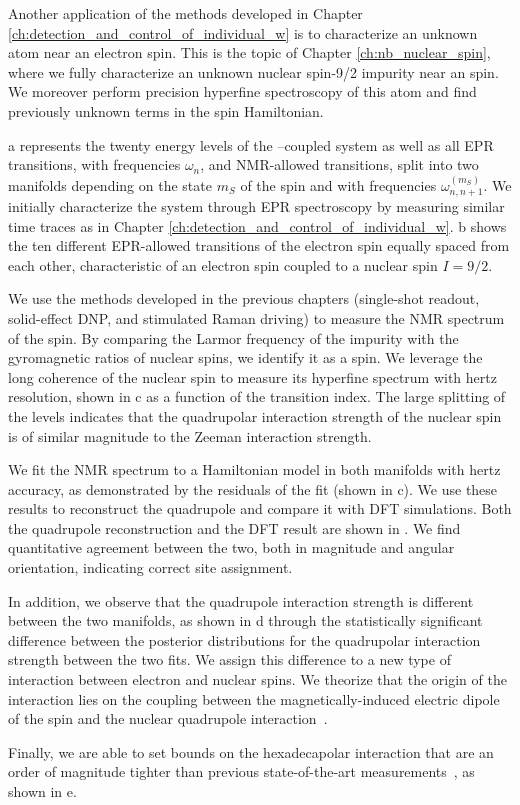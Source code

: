 Another application of the methods developed in Chapter \ref{ch:detection_and_control_of_individual_w} is to characterize an unknown atom near an electron spin. This is the topic of Chapter \ref{ch:nb_nuclear_spin}, where we fully characterize an unknown nuclear spin-9/2 impurity near an \Er spin. We moreover perform precision hyperfine spectroscopy of this \Nb atom and find previously unknown terms in the spin Hamiltonian.

a represents the twenty energy levels of the \Nb--\Er coupled system as well as all EPR transitions, with frequencies $\omega_n$, and NMR-allowed transitions, split into two manifolds depending on the state $m_S$ of the \Er spin and with frequencies $\omega_{n,n+1}^{(m_S)}$. We initially characterize the system through EPR spectroscopy by measuring similar time traces as in Chapter \ref{ch:detection_and_control_of_individual_w}. b shows the ten different EPR-allowed transitions of the electron spin equally spaced from each other, characteristic of an electron spin coupled to a nuclear spin $I=9/2$.

We use the methods developed in the previous chapters (single-shot readout, solid-effect DNP, and stimulated Raman driving) to measure the NMR spectrum of the \Nb spin. By comparing the Larmor frequency of the impurity with the gyromagnetic ratios of nuclear spins, we identify it as a \Nb spin. We leverage the long coherence of the nuclear spin to measure its hyperfine spectrum with hertz resolution, shown in c as a function of the transition index. The large splitting of the levels indicates that the quadrupolar interaction strength of the nuclear spin is of similar magnitude to the Zeeman interaction strength.

We fit the NMR spectrum to a Hamiltonian model in both \Er manifolds with hertz accuracy, as demonstrated by the residuals of the fit (shown in c). We use these results to reconstruct the \Nb quadrupole and compare it with DFT simulations. Both the quadrupole reconstruction and the DFT result are shown in . We find quantitative agreement between the two, both in magnitude and angular orientation, indicating correct site assignment.

In addition, we observe that the quadrupole interaction strength is different between the two manifolds, as shown in d through the statistically significant difference between the posterior distributions for the quadrupolar interaction strength between the two fits. We assign this difference to a new type of interaction between electron and nuclear spins. We theorize that the origin of the interaction lies on the coupling between the magnetically-induced electric dipole of the \Er spin and the nuclear quadrupole interaction~.

Finally, we are able to set bounds on the hexadecapolar interaction that are an order of magnitude tighter than previous state-of-the-art measurements~, as shown in e.

